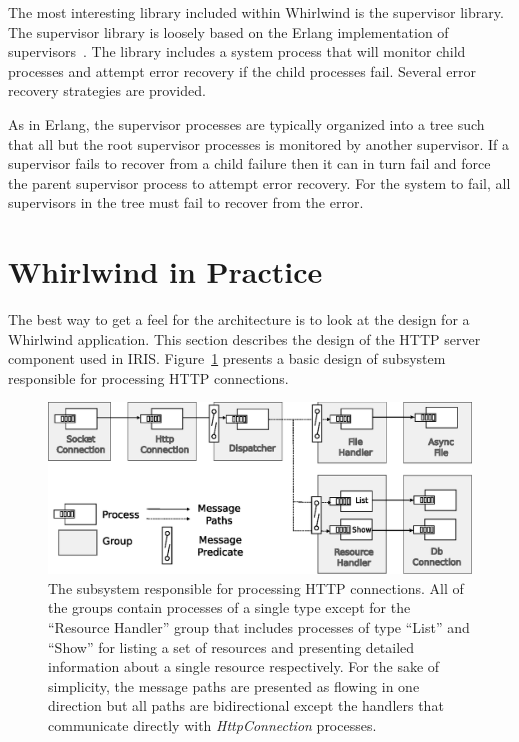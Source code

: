 \documentclass[conference]{IEEEtran}
\begin{document}
The most interesting library included within Whirlwind is the supervisor library. The supervisor library is loosely based on the Erlang implementation of supervisors~\cite{Armstrong03Thesis}. The library includes a system process that will monitor child processes and attempt error recovery if the child processes fail. Several error recovery strategies are provided. 

As in Erlang, the supervisor processes are typically organized into a tree such that all but the root supervisor processes is monitored by another supervisor. If a supervisor fails to recover from a child failure then it can in turn fail and force the parent supervisor process to attempt error recovery. For the system to fail, all supervisors in the tree must fail to recover from the error. 

\section{Whirlwind in Practice}

The best way to get a feel for the architecture is to look at the design for a Whirlwind application. This section describes the design of the HTTP server component used in IRIS. Figure~\ref{figure:http-server} presents a basic design of subsystem responsible for processing HTTP connections.

\begin{figure}[htbp]
\centering
\includegraphics[width=\textwidth]{http-server.eps}
\caption{The subsystem responsible for processing HTTP connections. All of the groups contain processes of a single type except for the ``Resource Handler'' group that includes processes of type ``List'' and ``Show'' for listing a set of resources and presenting detailed information about a single resource respectively. For the sake of simplicity, the message paths are presented as flowing in one direction but all paths are bidirectional except the handlers that communicate directly with \emph{HttpConnection} processes.}
\label{figure:http-server}
\end{figure} 
\end{document}

